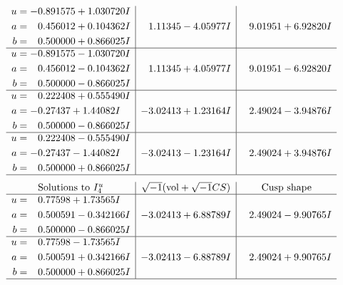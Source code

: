 \documentclass[1p]{elsarticle_modified}
\theoremstyle{definition}
\newcommand{\I}{\sqrt{-1}}
\begin{document}
$$\begin{array}{c|c|c}
\begin{aligned}
u &= -0.891575 + 1.030720 I \\
a &= \phantom{-}0.456012 + 0.104362 I \\
b &= \phantom{-}0.500000 + 0.866025 I\end{aligned}
 & \phantom{-}1.11345 - 4.05977 I & \phantom{-}9.01951 + 6.92820 I \\ \hline\begin{aligned}
u &= -0.891575 - 1.030720 I \\
a &= \phantom{-}0.456012 - 0.104362 I \\
b &= \phantom{-}0.500000 - 0.866025 I\end{aligned}
 & \phantom{-}1.11345 + 4.05977 I & \phantom{-}9.01951 - 6.92820 I \\ \hline\begin{aligned}
u &= \phantom{-}0.222408 + 0.555490 I \\
a &= -0.27437 + 1.44082 I \\
b &= \phantom{-}0.500000 - 0.866025 I\end{aligned}
 & -3.02413 + 1.23164 I & \phantom{-}2.49024 - 3.94876 I \\ \hline\begin{aligned}
u &= \phantom{-}0.222408 - 0.555490 I \\
a &= -0.27437 - 1.44082 I \\
b &= \phantom{-}0.500000 + 0.866025 I\end{aligned}
 & -3.02413 - 1.23164 I & \phantom{-}2.49024 + 3.94876 I\\
 \hline 
 \end{array}$$\newpage$$\begin{array}{c|c|c}  
\text{Solutions to }I^u_{4}& \I (\text{vol} + \sqrt{-1}CS) & \text{Cusp shape}\\
 \hline 
\begin{aligned}
u &= \phantom{-}0.77598 + 1.73565 I \\
a &= \phantom{-}0.500591 - 0.342166 I \\
b &= \phantom{-}0.500000 - 0.866025 I\end{aligned}
 & -3.02413 + 6.88789 I & \phantom{-}2.49024 - 9.90765 I \\ \hline\begin{aligned}
u &= \phantom{-}0.77598 - 1.73565 I \\
a &= \phantom{-}0.500591 + 0.342166 I \\
b &= \phantom{-}0.500000 + 0.866025 I\end{aligned}
 & -3.02413 - 6.88789 I & \phantom{-}2.49024 + 9.90765 I\\
 \hline 
 \end{array}$$\newpage\newpage\renewcommand{\arraystretch}{1}
\end{document}
